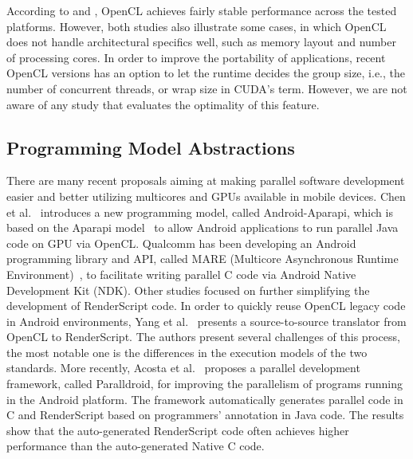 According to \cite{komatsu2010evaluating} and \cite{dolbeau2013one}, OpenCL
achieves fairly stable performance across the tested platforms. However, both
studies also illustrate some cases, in which OpenCL does not handle
architectural specifics well, such as memory layout and number of processing
cores. In order to improve the portability of applications, recent OpenCL
versions has an option to let the runtime decides the group size, i.e., the
number of concurrent threads, or wrap size in CUDA's term. However, we are not
aware of any study that evaluates the optimality of this feature.


\subsection{Programming Model Abstractions}


There are many recent proposals aiming at making parallel software development
easier and better utilizing multicores and GPUs available in
mobile devices. Chen et al.~\cite{6704508} introduces a new programming model,
called Android-Aparapi, which is based on the Aparapi model~\cite{Aparapi_web}
to allow Android applications to run parallel Java code on GPU via OpenCL.
Qualcomm has been developing an Android programming library and API, called
MARE (Multicore Asynchronous Runtime Environment)~\cite{MARE_qc}, to facilitate writing parallel
C code via Android Native Development Kit (NDK).
Other studies focused on further simplifying the development of RenderScript
code. In order to quickly reuse OpenCL legacy code in Android environments, Yang
et al.~\cite{yang2012o2render} presents a source-to-source translator from
OpenCL to RenderScript. The authors present several challenges of this process,
the most notable one is the differences in the execution models of the two
standards. More recently, Acosta et al.~\cite{alejandro2014performance}
proposes a parallel development framework, called Paralldroid, for improving the
parallelism of programs running in the Android platform. The framework
automatically generates parallel code in C and RenderScript based on
programmers' annotation in Java code. The results show that the auto-generated
RenderScript code often achieves higher performance than the auto-generated
Native C code.

